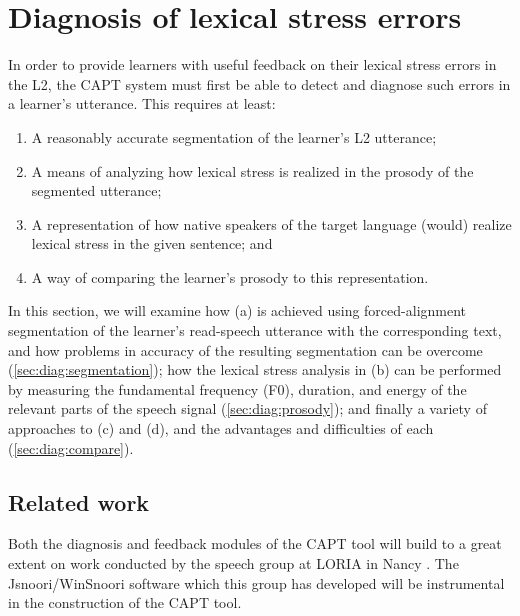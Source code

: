 %
%
\chapter{Diagnosis of lexical stress errors}
\label{chap:diagnosis}


In order to provide learners with useful feedback on their lexical stress errors in the L2, the CAPT system must first be able to detect and diagnose such errors in a learner's utterance. This requires at least:
\begin{enumerate}[label=(\alph*)]
\item A reasonably accurate segmentation of the learner's L2 utterance; %
\item A means of analyzing how lexical stress is realized in the prosody of the segmented utterance;
\item A representation of how native speakers of the target language (would) realize  lexical stress in the given sentence; and
\item A way of comparing the learner's prosody to this representation. 
\end{enumerate}

In this section, we will examine how (a) is achieved using forced-alignment segmentation of the learner's read-speech utterance with the corresponding text, and how problems in accuracy of the resulting segmentation can be overcome (\cref{sec:diag:segmentation}); how the lexical stress analysis in (b) can be performed by measuring the fundamental frequency (F0), duration, and energy of the relevant parts of the speech signal (\cref{sec:diag:prosody}); and finally a variety of approaches to (c) and (d), and the advantages and difficulties of each (\cref{sec:diag:compare}).

\section{Related work}
\label{sec:diag:related}

	Both the diagnosis and feedback modules of the CAPT tool will build to a great extent on work conducted by the speech group at LORIA in Nancy \citep{Bonneau2011,Fohr1996,Fohr2012,Mesbahi2011,Orosanu2012}. The Jsnoori/WinSnoori software \citep{Parole2013} %
which this group has developed will be instrumental in the construction of the CAPT tool. 
	
